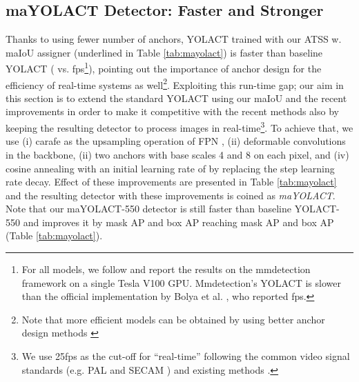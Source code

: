 \documentclass{bmvc2k}
\begin{document}
\subsection{maYOLACT Detector: Faster and Stronger}


Thanks to using fewer number of anchors, YOLACT trained with our ATSS w. maIoU assigner (underlined in Table \ref{tab:mayolact}) is  faster than baseline YOLACT ( vs.  fps\footnote{For all models, we follow and report the results on the  mmdetection framework \cite{mmdetection} on a single Tesla V100 GPU. Mmdetection's YOLACT is slower than the official implementation by Bolya et al. \cite{yolact}, who reported fps.}), pointing out the importance of anchor design for the efficiency of real-time systems as well\footnote{Note that more efficient models can be obtained by using better anchor design methods \cite{MetaAnchor,AdaptiveAnchor1,AdaptiveAnchor3,AdaptiveAnchor2}}. Exploiting this run-time gap; our aim in this section is to extend the standard YOLACT using our maIoU and the recent improvements in order to make it competitive with the recent methods also by keeping the resulting detector to process images in real-time\footnote{We use 25fps as the cut-off for ``real-time'' following the common video signal standards (e.g. PAL \cite{pal} and SECAM \cite{secam}) and existing methods \cite{bpd, salientod, basnet, tinieryolo}.}. To achieve that, we use (i) carafe \cite{carafe} as the upsampling operation of FPN \cite{FeaturePyramidNetwork}, (ii) deformable convolutions \cite{DCNv2} in the backbone, (ii) two anchors with base scales 4 and 8 on each pixel, and (iv) cosine annealing  with an initial learning rate of  by replacing the step learning rate decay. Effect of these improvements are presented in Table \ref{tab:mayolact} and the resulting detector with these improvements is coined as \textit{maYOLACT}. Note that our maYOLACT-550 detector is still faster than baseline YOLACT-550 and improves it by  mask AP and  box AP reaching  mask AP and  box AP (Table \ref{tab:mayolact}). 
\end{document}
